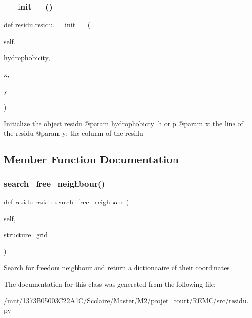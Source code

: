 \subsubsection{\texorpdfstring{\+\_\+\+\_\+init\+\_\+\+\_\+()}{\_\_init\_\_()}}
{\footnotesize\ttfamily def residu.\+residu.\+\_\+\+\_\+init\+\_\+\+\_\+ (\begin{DoxyParamCaption}\item[{}]{self,  }\item[{}]{hydrophobicity,  }\item[{}]{x,  }\item[{}]{y }\end{DoxyParamCaption})}

\begin{DoxyVerb}Initialize the object residu
    @param hydrophobicty: h or p
    @param   x: the line of the residu
    @param   y: the column of the residu
\end{DoxyVerb}
 

\subsection{Member Function Documentation}
\mbox{\label{classresidu_1_1residu_a63505767ea98b9e6e17196019c07ce1b}} 
\subsubsection{\texorpdfstring{search\+\_\+free\+\_\+neighbour()}{search\_free\_neighbour()}}
{\footnotesize\ttfamily def residu.\+residu.\+search\+\_\+free\+\_\+neighbour (\begin{DoxyParamCaption}\item[{}]{self,  }\item[{}]{structure\+\_\+grid }\end{DoxyParamCaption})}

\begin{DoxyVerb}Search for freedom neighbour and return a dictionnaire
of their coordinates
\end{DoxyVerb}
 

The documentation for this class was generated from the following file\+:\begin{DoxyCompactItemize}
\item 
/mnt/1373\+B05003\+C22\+A1\+C/\+Scolaire/\+Master/\+M2/projet\+\_\+court/\+R\+E\+M\+C/src/residu.\+py\end{DoxyCompactItemize}

